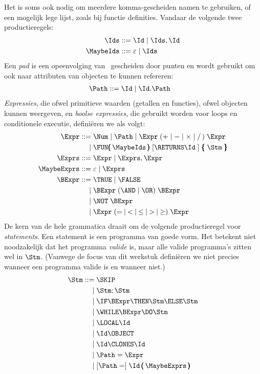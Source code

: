Het is soms ook nodig om meerdere komma-gescheiden namen te gebruiken, of een mogelijk lege lijst, zoals bij functie definities. Vandaar de volgende twee productieregels:
%
\begin{align*}
  \Ids \GrammarDef \Id \mid \Ids, \Id \\
  \MaybeIds \GrammarDef \varepsilon \mid \Ids
\end{align*}
%
Een \emph{pad} is een opeenvolging van \Ids\ gescheiden door punten en wordt gebruikt om ook naar attributen van objecten te kunnen refereren:
%
\begin{align*}
  \Path \GrammarDef \Id \mid \Id . \Path
\end{align*}
%
\emph{Expressies}, die ofwel primitieve waarden (getallen en functies), ofwel objecten kunnen weergeven, en \emph{boolse expressies}, die gebruikt worden voor loops en conditionele executie, definiëren we als volgt:
%
\begin{align*}
  \Expr \GrammarDef \Num \mid \Path \mid \Expr\; (+ \mid - \mid \times \mid /\,)\; \Expr \\
  \GrammarOr \FUN\pmb{(}\,\MaybeIds\,\pmb{)}\; \GrammarOpt{\RETURNS \Id\;} \pmb{\{}\; \Stm\; \pmb{\}} \\
  \Exprs \GrammarDef \Expr \mid \Exprs, \Expr \\
  \MaybeExprs \GrammarDef \varepsilon \mid \Exprs \\
  \BExpr \GrammarDef \TRUE \mid \FALSE \\
  \GrammarOr \BExpr\; (\AND \mid \OR)\; \BExpr \\
  \GrammarOr \NOT\; \BExpr \\
  \GrammarOr \Expr\; (=\: \mid\: <\: \mid\: \le\: \mid\: >\: \mid\: \ge)\; \Expr
\end{align*}
%
De kern van de hele grammatica draait om de volgende productieregel voor \emph{statements}. Een statement is een programma van goede vorm. Het betekent niet noodzakelijk dat het programma \emph{valide} is, maar alle valide programma's zitten wel in $\Stm$. (Vanwege de focus van dit werkstuk definiëren we niet precies wanneer een programma valide is en wanneer niet.)
%
\begin{align*}
  \Stm \GrammarDef \SKIP \\
  \GrammarOr \Stm; \Stm \\
  \GrammarOr \IF \BExpr \THEN \Stm \ELSE \Stm \\
  \GrammarOr \WHILE \BExpr \DO \Stm \\
  \GrammarOr \LOCAL \Id \\
  \GrammarOr \Id \OBJECT \\
  \GrammarOr \Id \CLONES \Id \\
  \GrammarOr \Path = \Expr \\
  \GrammarOr \GrammarOpt{\Path =} \Id\,\pmb{(}\,\MaybeExprs\,\pmb{)}
\end{align*}
